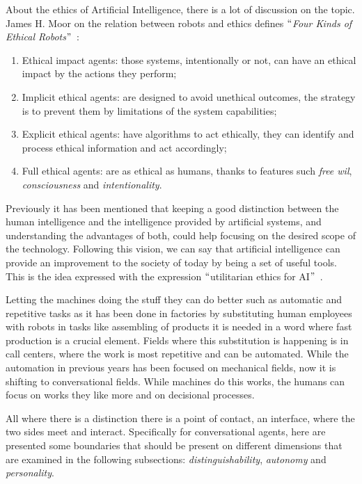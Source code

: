 About the ethics of Artificial Intelligence, there is a lot of discussion on the topic. James H. Moor on the relation between robots and ethics defines $``$\textit{Four Kinds of Ethical Robots}$"$~\cite{moor2009four}:

\begin{enumerate}
	\item Ethical impact agents: those systems, intentionally or not, can have an ethical impact by the actions they perform;

	\item Implicit ethical agents: are designed to avoid unethical outcomes, the strategy is to prevent them by limitations of the system capabilities;

	\item Explicit ethical agents: have algorithms to act ethically, they can identify and process ethical information and act accordingly;

	\item Full ethical agents: are as ethical as humans, thanks to features such \textit{free wil}, \textit{consciousness} and \textit{intentionality}.
\end{enumerate}

Previously it has been mentioned that keeping a good distinction between the human intelligence and the intelligence provided by artificial systems, and understanding the advantages of both, could help focusing on the desired scope of the technology. Following this vision, we can say that artificial intelligence can provide an improvement to the society of today by being a set of useful tools. This is the idea expressed with the expression $``$utilitarian ethics for AI$"$~\cite{hibbard2014ethical}.

Letting the machines doing the stuff they can do better such as automatic and repetitive tasks as it has been done in factories by substituting human employees with robots in tasks like assembling of products it is needed in a word where fast production is a crucial element. Fields where this substitution is happening is in call centers, where the work is most repetitive and can be automated. While the automation in previous years has been focused on mechanical fields, now it is shifting to conversational fields. While machines do this works, the humans can focus on works they like more and on decisional processes.

All where there is a distinction there is a point of contact, an interface, where the two sides meet and interact. Specifically for conversational agents, here are presented some boundaries that should be present on different dimensions that are examined in the following subsections: \textit{distinguishability}, \textit{autonomy} and \textit{personality}.

